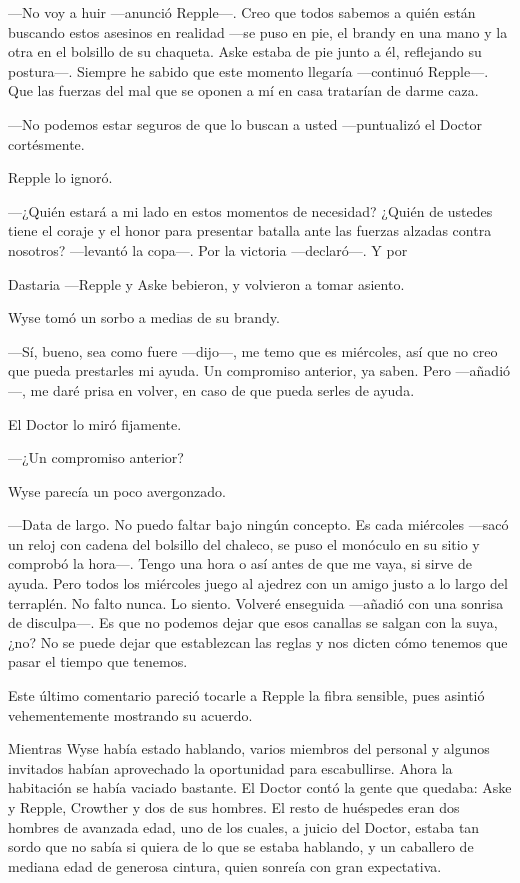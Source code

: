 {---No voy a huir ---anunció Repple---. Creo que todos sabemos a quién
	están buscando estos asesinos en realidad ---se puso en pie, el brandy
	en una mano y la otra en el bolsillo de su chaqueta. Aske estaba de pie
	junto a él, reflejando su postura---. Siempre he sabido que este momento
	llegaría ---continuó Repple---. Que las fuerzas del mal que se oponen a
mí en casa tratarían de darme caza.}

{---No podemos estar seguros de que lo buscan a usted ---puntualizó el
Doctor cortésmente.}

{Repple lo ignoró.}

{---¿Quién estará a mi lado en estos momentos de necesidad? ¿Quién de
	ustedes tiene el coraje y el honor para presentar batalla ante las
	fuerzas alzadas contra nosotros? ---levantó la copa---. Por la victoria
---declaró---. Y por}

{Dastaria ---Repple y Aske bebieron, y volvieron a tomar asiento.}

{Wyse tomó un sorbo a medias de su brandy.}

{---Sí, bueno, sea como fuere ---dijo---, me temo que es miércoles, así
	que no creo que pueda prestarles mi ayuda. Un compromiso anterior, ya
	saben. Pero ---añadió---, me daré prisa en volver, en caso de que pueda
serles de ayuda.}

{El Doctor lo miró fijamente.}

{---¿Un compromiso anterior?}

{Wyse parecía un poco avergonzado.}

{---Data de largo. No puedo faltar bajo ningún concepto. Es cada
	miércoles ---sacó un reloj con cadena del bolsillo del chaleco, se puso
	el monóculo en su sitio y comprobó la hora---. Tengo una hora o así
	antes de que me vaya, si sirve de ayuda. Pero todos los miércoles juego
	al ajedrez con un amigo justo a lo largo del terraplén. No falto nunca.
	Lo siento. Volveré enseguida ---añadió con una sonrisa de disculpa---.
	Es que no podemos dejar que esos canallas se salgan con la suya, ¿no?
	No se puede dejar que establezcan las reglas y nos dicten cómo tenemos
que pasar el tiempo que tenemos.}

{Este último comentario pareció tocarle a Repple la fibra sensible, pues
asintió vehementemente mostrando su acuerdo.}

{Mientras Wyse había estado hablando, varios miembros del personal y
	algunos invitados habían aprovechado la oportunidad para escabullirse.
	Ahora la habitación se había vaciado bastante. El Doctor contó la gente
	que quedaba: Aske y Repple, Crowther y dos de sus hombres. El resto de
	huéspedes eran dos hombres de avanzada edad, uno de los cuales, a juicio
	del Doctor, estaba tan sordo que no sabía si quiera de lo que se estaba
	hablando, y un caballero de mediana edad de generosa cintura, quien
sonreía con gran expectativa.}

